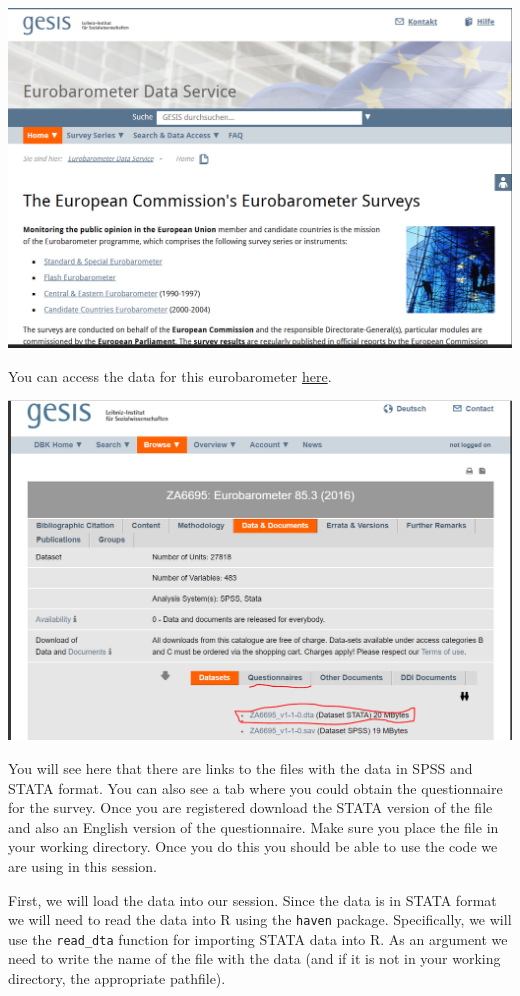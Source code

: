 \documentclass[]{book}
\theoremstyle{definition}
\theoremstyle{definition}
\theoremstyle{definition}
\theoremstyle{remark}
\begin{document}
\includegraphics{imgs/eb.PNG}

You can access the data for this eurobarometer
\href{https://dbk.gesis.org/dbksearch/sdesc2.asp?no=6695\&db=e\&doi=10.4232/1.13169}{here}.

\includegraphics{imgs/gesis.PNG}

You will see here that there are links to the files with the data in
SPSS and STATA format. You can also see a tab where you could obtain the
questionnaire for the survey. Once you are registered download the STATA
version of the file and also an English version of the questionnaire.
Make sure you place the file in your working directory. Once you do this
you should be able to use the code we are using in this session.

First, we will load the data into our session. Since the data is in
STATA format we will need to read the data into R using the
\texttt{haven} package. Specifically, we will use the \texttt{read\_dta}
function for importing STATA data into R. As an argument we need to
write the name of the file with the data (and if it is not in your
working directory, the appropriate pathfile).
\end{document}
